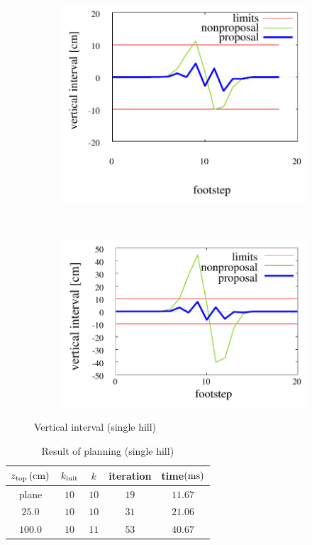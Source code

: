 \documentclass[autodetect-engine,dvipdfmx-if-dvi,ja=standard,a4j,jbase=11pt,magstyle=nomag*]{bxjsreport}
\begin{document}
\begin{figure}[pt]%
    \centering%
    \begin{subfigure}[c]{\linewidth}
        \centering%
        \includegraphics[width=0.75\linewidth, clip]{./figure/sim_hrp2_hill_25_zdiff.pdf}%
        \label{fig:sim_hrp2_hill_25_zdiff}%
    \end{subfigure}\\ %
    \vfil%
    \begin{subfigure}[c]{\linewidth}
        \centering%
        \includegraphics[width=0.75\linewidth, clip]{./figure/sim_hrp2_hill_100_zdiff.pdf}%
        \label{fig:sim_hrp2_hill_100_zdiff}%
    \end{subfigure}%
    \caption{Vertical interval (single hill)}%
    \label{fig:sim_hrp2_hill_zdiff}%
\end{figure}
\begin{table}[pt]%
    \caption{Result of planning (single hill)}%
    \label{tab:sim_hrp2_hill}%
    \centering%
    \begin{tabular}{ccccc}%
        \toprule%
        $z_{\mathrm{top}}\,(\si{\centi\meter})$   &   $k_{\mathrm{init}}$ &   $k$     &   iteration   &   time$(\si{\milli\second})$ \\%
        \midrule%
        plane                       &   $10$        &   $10$    &   $19$        &   $11.67$ \\%
        $25.0$                      &   $10$        &   $10$    &   $31$        &   $21.06$ \\%
        $100.0$                     &   $10$        &   $11$    &   $53$        &   $40.67$ \\%
        \bottomrule%
    \end{tabular}%
\end{table}
\end{document}
